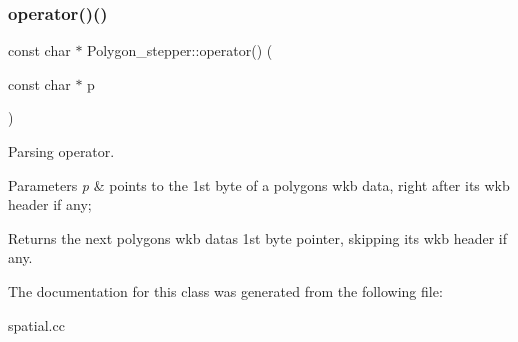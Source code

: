 \subsubsection{\texorpdfstring{operator()()}{operator()()}}
{\footnotesize\ttfamily const char $\ast$ Polygon\+\_\+stepper\+::operator() (\begin{DoxyParamCaption}\item[{const char $\ast$}]{p }\end{DoxyParamCaption})}

Parsing operator. 
\begin{DoxyParams}{Parameters}
{\em p} & points to the 1st byte of a polygon\textquotesingle{}s wkb data, right after its wkb header if any; \\
\hline
\end{DoxyParams}
\begin{DoxyReturn}{Returns}
the next polygon\textquotesingle{}s wkb data\textquotesingle{}s 1st byte pointer, skipping its wkb header if any. 
\end{DoxyReturn}


The documentation for this class was generated from the following file\+:\begin{DoxyCompactItemize}
\item 
spatial.\+cc\end{DoxyCompactItemize}
